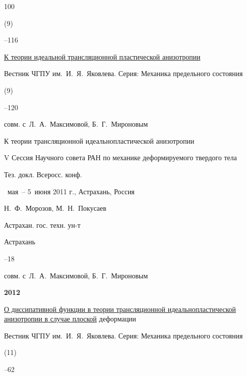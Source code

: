 \begin{thebibliography}{100}

(9)

–116





\paper \href{http://elibrary.ru/item.asp?id=16535352}{К теории идеальной трансляционной пластической анизотропии}

\jour Вестник ЧГПУ им.~И.~Я.~Яковлева. Серия: Механика предельного состояния


(9)

--120 

\miscnote совм. с~Л.~А.~Максимовой, Б.~Г.~Мироновым





\paper К теории трансляционной идеальнопластической анизотропии 

\inbook V Сессия Научного совета РАН по механике деформируемого твердого тела

\bookinfo Тез. докл. Всеросс. конф. \nofrills

~мая~– 5~июня 2011 г., Астрахань, Россия 

\eds Н.~Ф.~Морозов, М.~Н.~Покусаев

\publ Астрахан. гос. техн. ун-т

\publaddr Астрахань


–18 

\miscnote совм. с~Л.~А.~Максимовой, Б.~Г.~Мироновым



\item[] \centerline{\bf 2012}




\paper \href{http://elibrary.ru/item.asp?id=17772050}{О диссипативной функции в теории трансляционной идеальнопластической анизотропии в случае плоской} деформации 

\jour Вестник ЧГПУ им.~И.~Я.~Яковлева. Серия: Механика предельного состояния


 (11)

–62 


\end{thebibliography}
